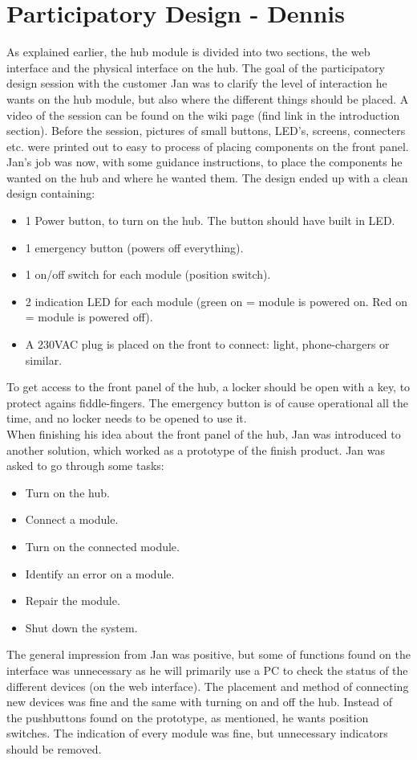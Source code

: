 \section{Participatory Design - Dennis}
As explained earlier, the hub module is divided into two sections, the web interface and the physical interface on the hub. 
The goal of the participatory design session with the customer Jan was to clarify the level of interaction he wants on the hub module, but also where the different things should be placed. A video of the session can be found on the wiki page (find link in the introduction section). Before the session, pictures of small buttons, LED's, screens, connecters etc. were printed out to easy to process of placing components on the front panel. Jan's job was now, with some guidance instructions, to place the components he wanted on the hub and where he wanted them. The design ended up with a clean design containing: 
\begin{itemize}
	\item 1 Power button, to turn on the hub. The button should have built in LED.
	\item 1 emergency button (powers off everything).
	\item 1 on/off switch for each module (position switch).
	\item 2 indication LED for each module (green on = module is powered on. Red on = module is powered off).
	\item A 230VAC plug is placed on the front to connect: light, phone-chargers or similar. 
\end{itemize}
To get access to the front panel of the hub, a locker should be open with a key, to protect agains fiddle-fingers. The emergency button is of cause operational all the time, and no locker needs to be opened to use it.
\\When finishing his idea about the front panel of the hub, Jan was introduced to another solution, which worked as a prototype of the finish product. Jan was asked to go through some tasks:
\begin{itemize}
	\item Turn on the hub.
	\item Connect a module.
	\item Turn on the connected module.
	\item Identify an error on a module.
	\item Repair the module.
	\item Shut down the system.
\end{itemize}
The general impression from Jan was positive, but some of functions found on the interface was unnecessary as he will primarily use a PC to check the status of the different devices (on the web interface). The placement and method of connecting new devices was fine and the same with turning on and off the hub. Instead of the pushbuttons found on the prototype, as mentioned, he wants position switches. The indication of every module was fine, but unnecessary indicators should be removed. 
